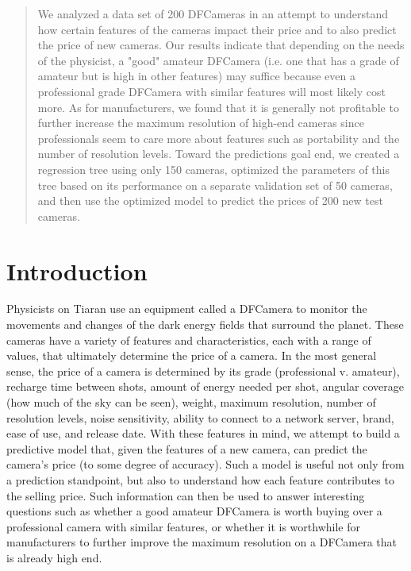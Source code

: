 \documentclass[12pt]{article}
\begin{document}
\def\ci{\perp\!\!\!\perp}

\begin{abstract}
We analyzed a data set of 200 DFCameras in an attempt to understand how certain features of the cameras impact their price and to also predict the price of new cameras. Our results indicate that depending on the needs of the physicist, a "good" amateur DFCamera (i.e. one that has a grade of amateur but is high in other features) may suffice because even a professional grade DFCamera with similar features will most likely cost more. As for manufacturers, we found that it is generally not profitable to further increase the maximum resolution of high-end cameras since professionals seem to care more about features such as portability and the number of resolution levels. Toward the predictions goal end, we created a regression tree using only 150 cameras, optimized the parameters of this tree based on its performance on a separate validation set of 50 cameras, and then use the optimized model to predict the prices of 200 new test cameras. 
\end{abstract}

\section{Introduction}

Physicists on Tiaran use an equipment called a DFCamera to monitor the movements and changes of the dark energy fields that surround the planet. These cameras have a variety of features and characteristics, each with a range of values, that ultimately determine the price of a camera. In the most general sense, the price of a camera is determined by its grade (professional v. amateur), recharge time between shots, amount of energy needed per shot, angular coverage (how much of the sky can be seen), weight, maximum resolution, number of resolution levels, noise sensitivity, ability to connect to a network server, brand, ease of use, and release date. With these features in mind, we attempt to build a predictive model that, given the features of a new camera, can predict the camera's price (to some degree of accuracy). Such a model is useful not only from a prediction standpoint, but also to understand how each feature contributes to the selling price. Such information can then be used to answer interesting questions such as whether a good amateur DFCamera is worth buying over a professional camera with similar features, or whether it is worthwhile for manufacturers to further improve the maximum resolution on a DFCamera that is already high end.\\
\end{document}

